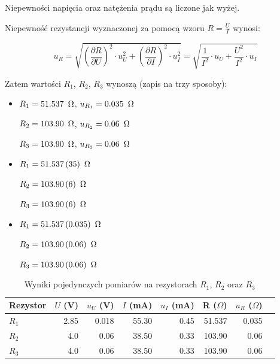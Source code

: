 \documentclass[a4paper]{article}
\newlength{\du}
\begin{document}
Niepewności napięcia oraz natężenia prądu są liczone jak wyżej.

Niepewność rezystancji wyznaczonej za pomocą wzoru $R = \frac{U}{I}$ wynosi:

$$u_R = \sqrt{(\frac{\partial R}{\partial U})^2 \cdot u_U^2 + (\frac{\partial R}{\partial I})^2 \cdot u_I^2} = \sqrt{\frac{1}{I^2} \cdot u_U + \frac{U^2}{I^2} \cdot u_I}$$



Zatem wartości $R_1$, $R_2$, $R_3$ wynoszą (zapis na trzy sposoby):

\begin{itemize}
\item $R_1 = 51.537 \enskip \Omega$, $u_{R_1} = 0.035 \enskip \Omega$

$R_2 = 103.90 \enskip \Omega$, $u_{R_2} = 0.06 \enskip \Omega$

$R_3 = 103.90 \enskip \Omega$, $u_{R_3} = 0.06 \enskip \Omega$

\item $R_1 = 51.537 \, (35) \enskip \Omega$

$R_2 = 103.90 \, (6) \enskip \Omega$

$R_3 = 103.90 \, (6) \enskip \Omega$

\item $R_1 = 51.537 \, (0.035) \enskip \Omega$

$R_2 = 103.90 \, (0.06) \enskip \Omega$

$R_3 = 103.90 \, (0.06) \enskip \Omega$
\end{itemize}

\begin{table}
\centering
\begin{tabular}{lrrrrrrl}
\toprule
Rezystor &  $U$ (V) &  $u_U$ (V) &  $I$ (mA) &  $u_I$ (mA) &  R ($\Omega$) &  $u_R$ ($\Omega$) \\
\midrule
$R_1$ &          2.85 &           0.018 &                  55.30 &              0.45 &             51.537 &             0.035 \\
$R_2$ &          4.0 &           0.06 &                  38.50 &              0.33 &            103.90 &             0.06 \\
$R_3$ &          4.0 &           0.06 &                  38.50 &              0.33 &            103.90 &             0.06 \\
\bottomrule
\end{tabular}
\caption{Wyniki pojedynczych pomiarów na rezystorach $R_1$, $R_2$ oraz $R_3$}
\label{pomiary_r123}
\end{table}
\end{document}
